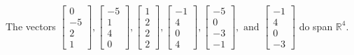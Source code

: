 \begin{exercise}
\begin{exerciseStatement}
  \end{exerciseStatement}
  \begin{exerciseAnswer}
   The vectors \(\left[\begin{array}{r}
0 \\
-5 \\
2 \\
1
\end{array}\right] , \left[\begin{array}{r}
-5 \\
1 \\
4 \\
0
\end{array}\right] , \left[\begin{array}{r}
1 \\
2 \\
2 \\
2
\end{array}\right] , \left[\begin{array}{r}
-1 \\
4 \\
0 \\
4
\end{array}\right] , \left[\begin{array}{r}
-5 \\
0 \\
-3 \\
-1
\end{array}\right] , \text{ and } \left[\begin{array}{r}
-1 \\
4 \\
0 \\
-3
\end{array}\right]\) 
  	 do  
	span \(\mathbb{R}^4\).
  


  \end{exerciseAnswer}
\end{exercise}